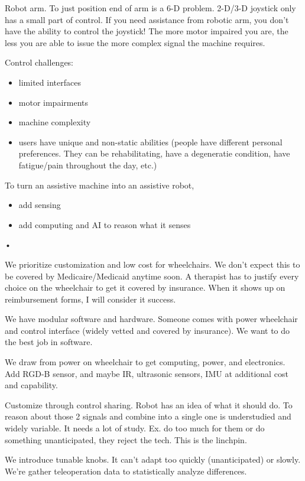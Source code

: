 Robot arm. To just position end of arm is a 6-D problem. 2-D/3-D joystick only has a small part of control. If you need assistance from robotic arm, you don't have the ability to control the joystick! The more motor impaired you are, the less you are able to issue the more complex signal the machine requires.

Control challenges:
\begin{itemize}
\item
limited interfaces
\item
motor impairments
\item
machine complexity
\item
users have unique and non-static abilities (people have different personal preferences. They can be rehabilitating, have a degeneratie condition, have fatigue/pain throughout the day, etc.)
\end{itemize}

To turn an assistive machine into an assistive robot,
\begin{itemize}
\item
add sensing
\item
add computing and AI to reason what it senses
\end{itemize}•

We prioritize customization and low cost for wheelchairs. We don't expect this to be covered by Medicaire/Medicaid anytime soon. A therapist has to justify every choice on the wheelchair to get it covered by insurance. When it shows up on reimbursement forms, I will consider it success.

We have modular software and hardware. Someone comes with power wheelchair and control interface (widely vetted and covered by insurance). We want to do the best job in software.

We draw from power on wheelchair to get computing, power, and electronics. Add RGD-B sensor, and maybe IR, ultrasonic sensors, IMU at additional cost and capability.

Customize through control sharing. Robot has an idea of what it should do. To reason about those 2 signals and combine into a single one is  understudied and widely variable. It needs a lot of study. Ex. do too much for them or do something unanticipated, they reject the tech. This is the linchpin.

We introduce tunable knobs. %
 It can't adapt too quickly (unanticipated) or slowly. We're gather teleoperation data to statistically analyze differences.
 
